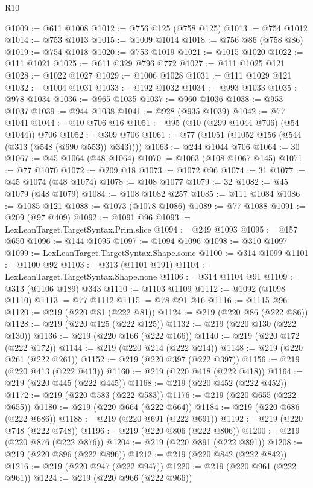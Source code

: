 \begin{lexlean}{R10}
\begin{coremodule}
{{{{{{{{{{{{{{{{{{{{{{{{{{{{{{{{{{{{{{{{{{{{{{{{{{{{{{{{{{{{{{{{{{{{{{{{{{{{{{{{{{{{{{{{{{{{{{{{{{{{{{{{{{{{@1009 := @611 @1008
@1012 := @756 @125 (@758 @125)
@1013 := @754 @1012
@1014 := @753 @1013
@1015 := @1009 @1014
@1018 := @756 @86 (@758 @86)
@1019 := @754 @1018
@1020 := @753 @1019
@1021 := @1015 @1020
@1022 := @111 @1021
@1025 := @611 @329 @796 @772
@1027 := @111 @1025 @121
@1028 := @1022 @1027
@1029 := @1006 @1028
@1031 := @111 @1029 @121
@1032 := @1004 @1031
@1033 := @192 @1032
@1034 := @993 @1033
@1035 := @978 @1034
@1036 := @965 @1035
@1037 := @960 @1036
@1038 := @953 @1037
@1039 := @944 @1038
@1041 := @928 (@935 @1039)
@1042 := @77 @1041
@1044 := @10 @706 @16
@1051 := @95 (@10 (@299 @1044 @706) (@54 @1044)) @706
@1052 := @309 @706
@1061 := @77 (@1051 (@1052 @156 (@544 (@313 (@548 (@690 @553)) @343))))
@1063 := @244 @1044 @706
@1064 := 30
@1067 := @45 @1064 (@48 @1064)
@1070 := @1063 (@108 @1067 @145)
@1071 := @77 @1070
@1072 := @209 @18
@1073 := @1072 @96
@1074 := 31
@1077 := @45 @1074 (@48 @1074)
@1078 := @108 @1077
@1079 := 32
@1082 := @45 @1079 (@48 @1079)
@1084 := @108 @1082 @257
@1085 := @111 @1084
@1086 := @1085 @121
@1088 := @1073 (@1078 @1086)
@1089 := @77 @1088
@1091 := @209 (@97 @409)
@1092 := @1091 @96
@1093 := LexLeanTarget.TargetSyntax.Prim.slice
@1094 := @249 @1093
@1095 := @157 @650
@1096 := @144 @1095
@1097 := @1094 @1096
@1098 := @310 @1097
@1099 := LexLeanTarget.TargetSyntax.Shape.some
@1100 := @314 @1099
@1101 := @1100 @92
@1103 := @313 (@1101 @191)
@1104 := LexLeanTarget.TargetSyntax.Shape.none
@1106 := @314 @1104 @91
@1109 := @313 (@1106 @189) @343
@1110 := @1103 @1109
@1112 := @1092 (@1098 @1110)
@1113 := @77 @1112
@1115 := @78 @91 @16
@1116 := @1115 @96
@1120 := @219 (@220 @81 (@222 @81))
@1124 := @219 (@220 @86 (@222 @86))
@1128 := @219 (@220 @125 (@222 @125))
@1132 := @219 (@220 @130 (@222 @130))
@1136 := @219 (@220 @166 (@222 @166))
@1140 := @219 (@220 @172 (@222 @172))
@1144 := @219 (@220 @214 (@222 @214))
@1148 := @219 (@220 @261 (@222 @261))
@1152 := @219 (@220 @397 (@222 @397))
@1156 := @219 (@220 @413 (@222 @413))
@1160 := @219 (@220 @418 (@222 @418))
@1164 := @219 (@220 @445 (@222 @445))
@1168 := @219 (@220 @452 (@222 @452))
@1172 := @219 (@220 @583 (@222 @583))
@1176 := @219 (@220 @655 (@222 @655))
@1180 := @219 (@220 @664 (@222 @664))
@1184 := @219 (@220 @686 (@222 @686))
@1188 := @219 (@220 @691 (@222 @691))
@1192 := @219 (@220 @748 (@222 @748))
@1196 := @219 (@220 @806 (@222 @806))
@1200 := @219 (@220 @876 (@222 @876))
@1204 := @219 (@220 @891 (@222 @891))
@1208 := @219 (@220 @896 (@222 @896))
@1212 := @219 (@220 @842 (@222 @842))
@1216 := @219 (@220 @947 (@222 @947))
@1220 := @219 (@220 @961 (@222 @961))
@1224 := @219 (@220 @966 (@222 @966))
}}}}}}}}}}}}}}}}}}}}}}}}}}}}}}}}}}}}}}}}}}}}}}}}}}}}}}}}}}}}}}}}}}}}}}}}}}}}}}}}}}}}}}}}}}}}}}}}}}}}}}}}}}}}
\end{coremodule}
\end{lexlean}
